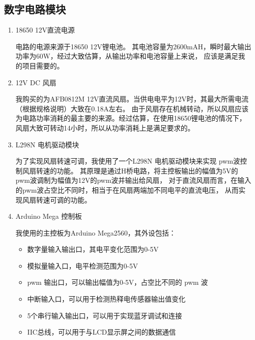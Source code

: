 \documentclass{article}
\begin{document}
\begin{spacing}{1.5}
\begin{enumerate}
    \end{enumerate}

    \subsection{数字电路模块}

    \begin{enumerate}
        \item 18650 12V直流电源

        电路的电源来源于18650 12V锂电池。
        其电池容量为2600mAH，瞬时最大输出功率为60W，经过大致估算，从输出功率和电池容量上来说，
        应该是满足我的项目需要的。
        
        \item 12V DC 风扇
        

        我购买的为AFB0812M 12V直流风扇。当供电电平为12V时，其最大所需电流（根据规格说明）大致在0.18A左右。
        由于风扇存在机械转动，所以风扇应该为电路功率消耗的最主要的来源。经过估算，在使用18650锂电池的情况下，
        风扇大致可转动14小时，所以从功率消耗上是满足要求的。

        \item L298N 电机驱动模块

        为了实现风扇转速可调，我使用了一个L298N 电机驱动模块来实现 pwm波控制风扇转速的功能。
        其原理是通过H桥电路，将主控板输出的幅值为5V的pwm波调制为幅值为12V的pwm波并输出给风扇，
        对于直流风扇而言，在输入的pwm波占空比不同时，相当于在风扇两端加不同电平的直流电压，
        从而实现风扇转速可调的功能。

        \item Arduino Mega 控制板

        我使用的主控板为Arduino Mega2560，其外设包括：
        \begin{itemize}
            \item 数字量输入输出口，其电平变化范围为0-5V
            \item 模拟量输入口，电平检测范围为0-5V
            \item pwm 输出口，可以输出幅值为0-5V，占空比不同的 pwm 波
            \item 中断输入口，可以用于检测热释电传感器输出值变化
            \item 5个串行输入输出口，可以用于实现蓝牙调试和连接
            \item IIC总线，可以用于与LCD显示屏之间的数据通信
        \end{itemize}


\end{enumerate}
\end{spacing}
\end{document}
